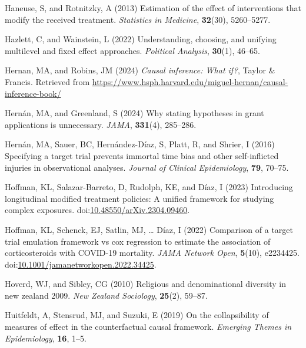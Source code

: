 \documentclass[
  single column]{article}
\newlength{\cslhangindent}
\newenvironment{CSLReferences}[2] %
 {\begin{list}{}{%
  \setlength{\itemindent}{0pt}
  \setlength{\leftmargin}{0pt}
  \setlength{\parsep}{0pt}
  \ifodd #1
   \setlength{\leftmargin}{\cslhangindent}
   \setlength{\itemindent}{-1\cslhangindent}
  \fi
  \setlength{\itemsep}{#2\baselineskip}}}
 {\end{list}}
\begin{document}
\begin{CSLReferences}{1}{0}
Haneuse, S, and Rotnitzky, A (2013) Estimation of the effect of
interventions that modify the received treatment. \emph{Statistics in
Medicine}, \textbf{32}(30), 5260--5277.

Hazlett, C, and Wainstein, L (2022) Understanding, choosing, and
unifying multilevel and fixed effect approaches. \emph{Political
Analysis}, \textbf{30}(1), 46--65.

Hernan, MA, and Robins, JM (2024) \emph{Causal inference: What if?},
Taylor \& Francis. Retrieved from
\url{https://www.hsph.harvard.edu/miguel-hernan/causal-inference-book/}

Hernán, MA, and Greenland, S (2024) Why stating hypotheses in grant
applications is unnecessary. \emph{JAMA}, \textbf{331}(4), 285--286.

Hernán, MA, Sauer, BC, Hernández-Díaz, S, Platt, R, and Shrier, I (2016)
Specifying a target trial prevents immortal time bias and other
self-inflicted injuries in observational analyses. \emph{Journal of
Clinical Epidemiology}, \textbf{79}, 70--75.

Hoffman, KL, Salazar-Barreto, D, Rudolph, KE, and Díaz, I (2023)
Introducing longitudinal modified treatment policies: A unified
framework for studying complex exposures.
doi:\href{https://doi.org/10.48550/arXiv.2304.09460}{10.48550/arXiv.2304.09460}.

Hoffman, KL, Schenck, EJ, Satlin, MJ, \ldots{} Díaz, I (2022) Comparison
of a target trial emulation framework vs cox regression to estimate the
association of corticosteroids with COVID-19 mortality. \emph{JAMA
Network Open}, \textbf{5}(10), e2234425.
doi:\href{https://doi.org/10.1001/jamanetworkopen.2022.34425}{10.1001/jamanetworkopen.2022.34425}.

Hoverd, WJ, and Sibley, CG (2010) Religious and denominational diversity
in new zealand 2009. \emph{New Zealand Sociology}, \textbf{25}(2),
59--87.

Huitfeldt, A, Stensrud, MJ, and Suzuki, E (2019) On the collapsibility
of measures of effect in the counterfactual causal framework.
\emph{Emerging Themes in Epidemiology}, \textbf{16}, 1--5.


\end{CSLReferences}
\end{document}

